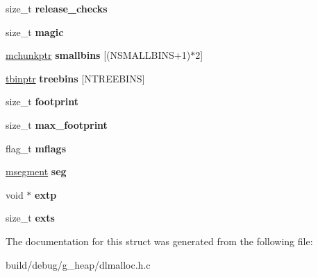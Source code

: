 \begin{DoxyCompactItemize}
\item 
\hypertarget{structmalloc__state_af2afbe4faf64185994d9c10cef2e0a3a}{size\-\_\-t {\bfseries release\-\_\-checks}}\label{structmalloc__state_af2afbe4faf64185994d9c10cef2e0a3a}

\item 
\hypertarget{structmalloc__state_ac19e13bf018dc22419c38d8cbe839b62}{size\-\_\-t {\bfseries magic}}\label{structmalloc__state_ac19e13bf018dc22419c38d8cbe839b62}

\item 
\hypertarget{structmalloc__state_ae8e4276227c87135f46a3f911d13e724}{\hyperlink{structmalloc__chunk}{mchunkptr} {\bfseries smallbins} \mbox{[}(N\-S\-M\-A\-L\-L\-B\-I\-N\-S+1)$\ast$2\mbox{]}}\label{structmalloc__state_ae8e4276227c87135f46a3f911d13e724}

\item 
\hypertarget{structmalloc__state_a12037db1ac57c76def84e2a441884ba2}{\hyperlink{structmalloc__tree__chunk}{tbinptr} {\bfseries treebins} \mbox{[}N\-T\-R\-E\-E\-B\-I\-N\-S\mbox{]}}\label{structmalloc__state_a12037db1ac57c76def84e2a441884ba2}

\item 
\hypertarget{structmalloc__state_a77ec93dc40bb85bd7a3c4e9b26547d11}{size\-\_\-t {\bfseries footprint}}\label{structmalloc__state_a77ec93dc40bb85bd7a3c4e9b26547d11}

\item 
\hypertarget{structmalloc__state_ac5c720358079598dfb5d699124e761c8}{size\-\_\-t {\bfseries max\-\_\-footprint}}\label{structmalloc__state_ac5c720358079598dfb5d699124e761c8}

\item 
\hypertarget{structmalloc__state_a44ff83ca07796cad96f2289471c88d2d}{flag\-\_\-t {\bfseries mflags}}\label{structmalloc__state_a44ff83ca07796cad96f2289471c88d2d}

\item 
\hypertarget{structmalloc__state_a899c69eca79f165b03913063a93d973a}{\hyperlink{structmalloc__segment}{msegment} {\bfseries seg}}\label{structmalloc__state_a899c69eca79f165b03913063a93d973a}

\item 
\hypertarget{structmalloc__state_af512a84f391eff6f59fcd71d7ef3e1df}{void $\ast$ {\bfseries extp}}\label{structmalloc__state_af512a84f391eff6f59fcd71d7ef3e1df}

\item 
\hypertarget{structmalloc__state_af3c1e272f4107a5006ee10429cb2232a}{size\-\_\-t {\bfseries exts}}\label{structmalloc__state_af3c1e272f4107a5006ee10429cb2232a}

\end{DoxyCompactItemize}


The documentation for this struct was generated from the following file\-:\begin{DoxyCompactItemize}
\item 
build/debug/g\-\_\-heap/dlmalloc.\-h.\-c\end{DoxyCompactItemize}
